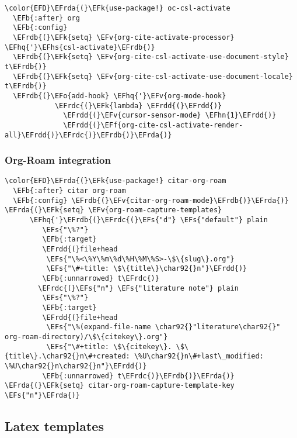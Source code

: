 \documentclass[c]{article}
\theoremstyle{plain}%
\theoremstyle{definition}
\theoremstyle{remark}
\newcommand{\EFs}[1]{\textcolor{EFs}{#1}} %
\newcommand{\EFk}[1]{\textcolor{EFk}{#1}} %
\newcommand{\EFb}[1]{\textcolor{EFb}{#1}} %
\newcommand{\EFf}[1]{\textcolor{EFf}{#1}} %
\newcommand{\EFv}[1]{\textcolor{EFv}{#1}} %
\newcommand{\EFo}[1]{\textcolor{EFo}{#1}} %
\newcommand{\EFhn}[1]{\textcolor{EFhn}{#1}} %
\newcommand{\EFhq}[1]{\textcolor{EFhq}{#1}} %
\newcommand{\EFhs}[1]{\textcolor{EFhs}{#1}} %
\newcommand{\EFrda}[1]{\textcolor{EFrda}{#1}} %
\newcommand{\EFrdb}[1]{\textcolor{EFrdb}{#1}} %
\newcommand{\EFrdc}[1]{\textcolor{EFrdc}{#1}} %
\newcommand{\EFrdd}[1]{\textcolor{EFrdd}{#1}} %
\begin{document}
\begin{Code}
\begin{Verbatim}
\color{EFD}\EFrda{(}\EFk{use-package!} oc-csl-activate
  \EFb{:after} org
  \EFb{:config}
  \EFrdb{(}\EFk{setq} \EFv{org-cite-activate-processor} \EFhq{'}\EFhs{csl-activate}\EFrdb{)}
  \EFrdb{(}\EFk{setq} \EFv{org-cite-csl-activate-use-document-style} t\EFrdb{)}
  \EFrdb{(}\EFk{setq} \EFv{org-cite-csl-activate-use-document-locale} t\EFrdb{)}
  \EFrdb{(}\EFo{add-hook} \EFhq{'}\EFv{org-mode-hook}
            \EFrdc{(}\EFk{lambda} \EFrdd{(}\EFrdd{)}
              \EFrdd{(}\EFv{cursor-sensor-mode} \EFhn{1}\EFrdd{)}
              \EFrdd{(}\EFf{org-cite-csl-activate-render-all}\EFrdd{)}\EFrdc{)}\EFrdb{)}\EFrda{)}

\end{Verbatim}
\end{Code}
\subsubsection{Org-Roam integration}
\label{sec:org45315a5}
\begin{Code}
\begin{Verbatim}
\color{EFD}\EFrda{(}\EFk{use-package!} citar-org-roam
  \EFb{:after} citar org-roam
  \EFb{:config} \EFrdb{(}\EFv{citar-org-roam-mode}\EFrdb{)}\EFrda{)}
\EFrda{(}\EFk{setq} \EFv{org-roam-capture-templates}
      \EFhq{'}\EFrdb{(}\EFrdc{(}\EFs{"d"} \EFs{"default"} plain
         \EFs{"\%?"}
         \EFb{:target}
         \EFrdd{(}file+head
          \EFs{"\%<\%Y\%m\%d\%H\%M\%S>-\$\{slug\}.org"}
          \EFs{"\#+title: \$\{title\}\char92{}n"}\EFrdd{)}
         \EFb{:unnarrowed} t\EFrdc{)}
        \EFrdc{(}\EFs{"n"} \EFs{"literature note"} plain
         \EFs{"\%?"}
         \EFb{:target}
         \EFrdd{(}file+head
          \EFs{"\%(expand-file-name \char92{}"literature\char92{}" org-roam-directory)/\$\{citekey\}.org"}
          \EFs{"\#+title: \$\{citekey\}. \$\{title\}.\char92{}n\#+created: \%U\char92{}n\#+last\_modified: \%U\char92{}n\char92{}n"}\EFrdd{)}
         \EFb{:unnarrowed} t\EFrdc{)}\EFrdb{)}\EFrda{)}
\EFrda{(}\EFk{setq} citar-org-roam-capture-template-key \EFs{"n"}\EFrda{)}
\end{Verbatim}
\end{Code}
\subsection{Latex templates}
\label{sec:org61630f5}
\end{document}
